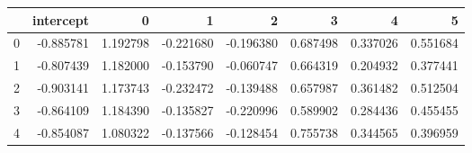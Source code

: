 \begin{tabular}{lrrrrrrr}
\toprule
{} &  intercept &         0 &         1 &         2 &         3 &         4 &         5 \\
\midrule
0 &  -0.885781 &  1.192798 & -0.221680 & -0.196380 &  0.687498 &  0.337026 &  0.551684 \\
1 &  -0.807439 &  1.182000 & -0.153790 & -0.060747 &  0.664319 &  0.204932 &  0.377441 \\
2 &  -0.903141 &  1.173743 & -0.232472 & -0.139488 &  0.657987 &  0.361482 &  0.512504 \\
3 &  -0.864109 &  1.184390 & -0.135827 & -0.220996 &  0.589902 &  0.284436 &  0.455455 \\
4 &  -0.854087 &  1.080322 & -0.137566 & -0.128454 &  0.755738 &  0.344565 &  0.396959 \\
\bottomrule
\end{tabular}
